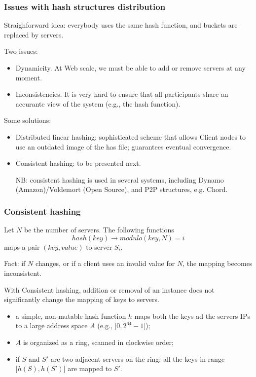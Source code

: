 \documentclass{beamer}
\begin{document}
\begin{frame}
\frametitle{Issues with hash structures distribution}

Straighforward idea: everybody uses the same hash function, and buckets are
replaced by servers. 

\vfill

Two issues:

\begin{itemize}
  \item \alert{Dynamicity}. At Web scale, we must be able to add or remove
  servers at any moment.
\item \alert{Inconsistencies}. It is very hard to ensure that all participants
share an accurante view of the system (e.g., the hash function).
\end{itemize}

\vfill

Some solutions:
\begin{itemize}
  \item \alert{Distributed linear hashing}: sophisticated scheme that allows
  Client nodes to use an outdated image of the has file; guarantees eventual
  convergence.
  \item \alert{Consistent hashing}: to be presented next.
  
  NB: consistent hashing is used in several systems, including Dynamo
  (Amazon)/Voldemort (Open Source), and P2P structures, e.g. Chord.
\end{itemize}
\end{frame}


\begin{frame}
\frametitle{Consistent hashing}

Let $N$ be the number of servers. The following functions
$$hash(key) \to modulo (key, N) = i$$
maps a pair $(key, value)$ to server $S_i$.

\vfill

\alert{Fact}: if $N$ changes, or if a client uses an invalid value for $N$, the
mapping becomes inconsistent.

\vfill

With \alert{Consistent hashing}, addition or removal of an instance does
not significantly change the mapping of keys to servers.

\begin{itemize}
  \item a simple, non-mutable hash function $h$ maps \alert{both} the keys ad
   the servers IPs to a large address space $A$ (e.g., $[0, 2^{64}-1$]);
  \item $A$ is organized as a ring, scanned in clockwise order;
  \item if $S$ and $S'$ are two adjacent servers on the ring:  
  all the keys in range $]h(S), h(S')]$ are mapped to $S'$.
\end{itemize}
\end{frame}
\end{document}
